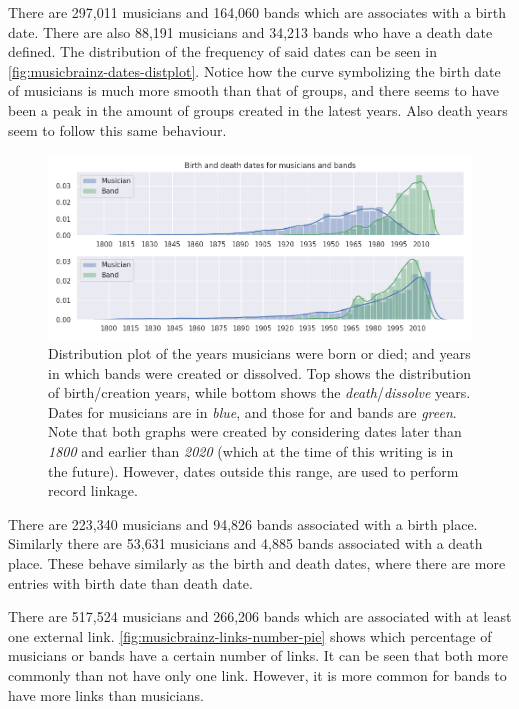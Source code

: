 \documentclass[epsfig,a4paper,11pt,titlepage,twoside,openany]{book}
\begin{document}
There are 297,011 musicians and 164,060 bands which are associates with a birth date. There are also 88,191 musicians and 34,213 bands who have a death date defined. The distribution of the frequency of said dates can be seen in \autoref{fig:musicbrainz-dates-distplot}. Notice how the curve symbolizing the birth date of musicians is much more smooth than that of groups, and there seems to have been a peak in the amount of groups created in the latest years. Also death years seem to follow this same behaviour.

\begin{figure}[]
  \centering \includegraphics[width=\textwidth]{musicbrainz_birth_death_dates_distplot} 
  \caption{Distribution plot of the years musicians were born or died; and years in which bands were created or dissolved. Top shows the distribution of birth/creation years, while bottom shows the \textit{death}/\textit{dissolve} years. Dates for musicians are in \textit{blue}, and those for and bands are \textit{green}. Note that both graphs were created by considering dates later than \textit{1800} and earlier than \textit{2020} (which at the time of this writing is in the future). However, dates outside this range, are used to perform record linkage.}
  \label{fig:musicbrainz-dates-distplot}
\end{figure}

There are 223,340 musicians and 94,826 bands associated with a birth place. Similarly there are 53,631 musicians and 4,885 bands associated with a death place. These behave similarly as the birth and death dates, where there are more entries with birth date than death date.

There are 517,524 musicians and 266,206 bands which are associated with at least one external link. \autoref{fig:musicbrainz-links-number-pie} shows which percentage of musicians or bands have a certain number of links. It can be seen that both more commonly than not have only one link. However, it is more common for bands to have more links than musicians. 
\end{document}
